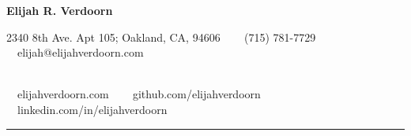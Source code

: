 
\usepackage[letterpaper,margin=0.5in]{geometry}
\usepackage[utf8]{inputenc}
\usepackage{mdwlist}
\usepackage{hyperref}
\usepackage[T1]{fontenc}
\usepackage{textcomp}
\usepackage{tgpagella}
\pagestyle{empty}

\newenvironment{indentsection}[1]%
{\begin{list}{}%
	{\setlength{\leftmargin}{#1}}%
	\item[]%
}
{\end{list}}

\newenvironment{unindentsection}[1]%
{\begin{list}{}%
	{\setlength{\leftmargin}{-0.5#1}}%
	\item[]%
}
{\end{list}}

\newcommand{\headerrow}[2]
{\begin{tabular*}{\linewidth}{l@{\extracolsep{\fill}}r}
	#1 &
	#2 \\
\end{tabular*}}

\newcommand{\CPP}
{C\nolinebreak[4]\hspace{-.05em}\raisebox{.22ex}{\footnotesize\bf ++}}




\begin{center}
{\LARGE \textbf{Elijah R. Verdoorn}}

2340 8th Ave. Apt 105; Oakland, CA, 94606 \ \textbullet
\ \ (715) 781-7729\ \ \textbullet
\ \ elijah@elijahverdoorn.com

\\
\ \ elijahverdoorn.com \ \textbullet
\ \ github.com/elijahverdoorn \ \textbullet
\ \ linkedin.com/in/elijahverdoorn
\end{center}

\hrule
\vspace{1em}

